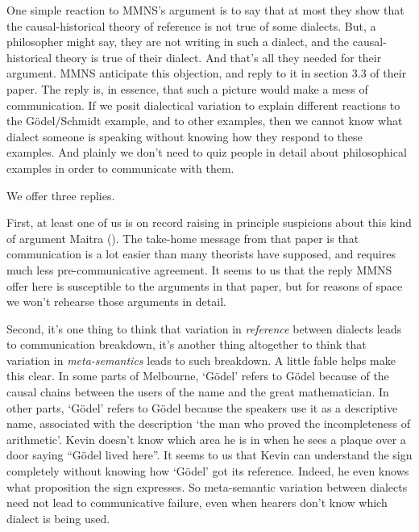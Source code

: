 \documentclass[
  10pt,
  letterpaper,
  DIV=11,
  numbers=noendperiod,
  twoside]{scrartcl}
\begin{document}
One simple reaction to MMNS's argument is to say that at most they show
that the causal-historical theory of reference is not true of some
dialects. But, a philosopher might say, they are not writing in such a
dialect, and the causal-historical theory is true of their dialect. And
that's all they needed for their argument. MMNS anticipate this
objection, and reply to it in section 3.3 of their paper. The reply is,
in essence, that such a picture would make a mess of communication. If
we posit dialectical variation to explain different reactions to the
Gödel/Schmidt example, and to other examples, then we cannot know what
dialect someone is speaking without knowing how they respond to these
examples. And plainly we don't need to quiz people in detail about
philosophical examples in order to communicate with them.

We offer three replies.

First, at least one of us is on record raising in principle suspicions
about this kind of argument Maitra ().
The take-home message from that paper is that communication is a lot
easier than many theorists have supposed, and requires much less
pre-communicative agreement. It seems to us that the reply MMNS offer
here is susceptible to the arguments in that paper, but for reasons of
space we won't rehearse those arguments in detail.

Second, it's one thing to think that variation in \emph{reference}
between dialects leads to communication breakdown, it's another thing
altogether to think that variation in \emph{meta-semantics} leads to
such breakdown. A little fable helps make this clear. In some parts of
Melbourne, `Gödel' refers to Gödel because of the causal chains between
the users of the name and the great mathematician. In other parts,
`Gödel' refers to Gödel because the speakers use it as a descriptive
name, associated with the description `the man who proved the
incompleteness of arithmetic'. Kevin doesn't know which area he is in
when he sees a plaque over a door saying ``Gödel lived here''. It seems
to us that Kevin can understand the sign completely without knowing how
`Gödel' got its reference. Indeed, he even knows what proposition the
sign expresses. So meta-semantic variation between dialects need not
lead to communicative failure, even when hearers don't know which
dialect is being used.
\end{document}
